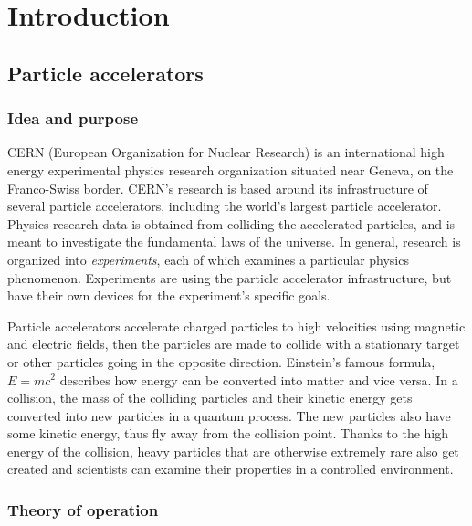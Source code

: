 \documentclass[12pt]{article}
\begin{document}
\newpage
\section{Introduction}\label{sec_intro}

\subsection{Particle accelerators}\label{sec_part_accel_intro}

\subsubsection{Idea and purpose}\label{sec_part_accel_idea}

CERN (European Organization for Nuclear Research) is an international high energy experimental physics research organization situated near Geneva, on the Franco-Swiss border. CERN's research is based around its infrastructure of several particle accelerators, including the world's largest particle accelerator. Physics research data is obtained from colliding the accelerated particles, and is meant to investigate the fundamental laws of the universe. In general, research is organized into \textit{experiments}, each of which examines a particular physics phenomenon. Experiments are using the particle accelerator infrastructure, but have their own devices for the experiment's specific goals.
\cite{cern_about}

\vspace{1pc}\noindent
Particle accelerators accelerate charged particles to high velocities using magnetic and electric fields, then the particles are made to collide with a stationary target or other particles going in the opposite direction. Einstein's famous formula, $E=mc^2$ describes how energy can be converted into matter and vice versa. In a collision, the mass of the colliding particles and their kinetic energy gets converted into new particles in a quantum process. The new particles also have some kinetic energy, thus fly away from the collision point. Thanks to the high energy of the collision, heavy particles that are otherwise extremely rare also get created and scientists can examine their properties in a controlled environment.

\subsubsection{Theory of operation}\label{sec_part_accel_theory}
\end{document}
